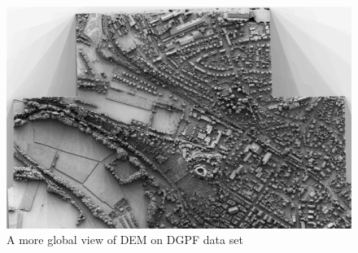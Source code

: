 \begin{figure}
\includegraphics[width=180 mm]{FIGS/SAMPLES/DGPF-GLOB.jpg}
\caption{A more global view of DEM on DGPF data set}
\end{figure}




